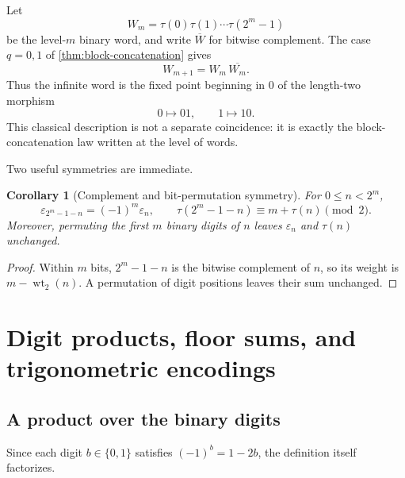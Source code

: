 \documentclass[11pt,oneside]{article}
\newtheorem{corollary}[theorem]{Corollary}
\theoremstyle{definition}
\theoremstyle{remark}
\newcommand{\wt}{\operatorname{wt}_2}
\begin{document}
Let
\begin{equation}
  W_m=\tau(0)\tau(1)\cdots\tau(2^m-1)                       \label{eq:word-Wm}
\end{equation}
be the level-$m$ binary word, and write $\overline{W}$ for bitwise complement.
The case $q=0,1$ of \cref{thm:block-concatenation} gives
\begin{equation}
  W_{m+1}=W_m\,\overline{W_m}.                              \label{eq:word-substitution}
\end{equation}
Thus the infinite word is the fixed point beginning in $0$ of the length-two
morphism
\begin{equation}
  0\longmapsto01,
  \qquad
  1\longmapsto10.                                          \label{eq:thue-morphism}
\end{equation}
This classical description is not a separate coincidence: it is exactly the
block-concatenation law written at the level of words.

Two useful symmetries are immediate.

\begin{corollary}[Complement and bit-permutation symmetry]
\label{cor:complement-symmetry}
For $0\le n<2^m$,
\begin{equation}
  \varepsilon_{2^m-1-n}=(-1)^m\varepsilon_n,
  \qquad
  \tau(2^m-1-n)\equiv m+\tau(n)\pmod2.                     \label{eq:block-complement}
\end{equation}
Moreover, permuting the first $m$ binary digits of $n$ leaves $\varepsilon_n$
and $\tau(n)$ unchanged.
\end{corollary}

\begin{proof}
Within $m$ bits, $2^m-1-n$ is the bitwise complement of $n$, so its weight is
$m-\wt(n)$.  A permutation of digit positions leaves their sum unchanged.
\end{proof}

\section{Digit products, floor sums, and trigonometric encodings}
\label{sec:digit-floor}

\subsection{A product over the binary digits}

Since each digit $b\in\{0,1\}$ satisfies $(-1)^b=1-2b$, the definition itself
factorizes.
\end{document}
